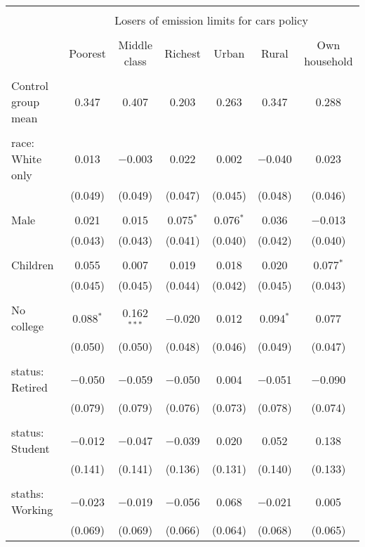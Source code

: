 
\begin{tabular}{@{\extracolsep{5pt}}lcccccc} 
\\[-1.8ex]\hline 
\hline \\[-1.8ex] 
 & \multicolumn{6}{c}{Losers of emission limits for cars policy} \\ 
\cline{2-7} 
\\[-1.8ex] & Poorest & Middle class & Richest & Urban & Rural & Own household \\ 
\hline \\[-1.8ex] 
 Control group mean & 0.347 & 0.407 & 0.203 & 0.263 & 0.347 & 0.288  \\ \hline \\[-1.8ex] race: White only & 0.013 & $-$0.003 & 0.022 & 0.002 & $-$0.040 & 0.023 \\ 
  & (0.049) & (0.049) & (0.047) & (0.045) & (0.048) & (0.046) \\ 
  & & & & & & \\ 
 Male & 0.021 & 0.015 & 0.075$^{*}$ & 0.076$^{*}$ & 0.036 & $-$0.013 \\ 
  & (0.043) & (0.043) & (0.041) & (0.040) & (0.042) & (0.040) \\ 
  & & & & & & \\ 
 Children & 0.055 & 0.007 & 0.019 & 0.018 & 0.020 & 0.077$^{*}$ \\ 
  & (0.045) & (0.045) & (0.044) & (0.042) & (0.045) & (0.043) \\ 
  & & & & & & \\ 
 No college & 0.088$^{*}$ & 0.162$^{***}$ & $-$0.020 & 0.012 & 0.094$^{*}$ & 0.077 \\ 
  & (0.050) & (0.050) & (0.048) & (0.046) & (0.049) & (0.047) \\ 
  & & & & & & \\ 
 status: Retired & $-$0.050 & $-$0.059 & $-$0.050 & 0.004 & $-$0.051 & $-$0.090 \\ 
  & (0.079) & (0.079) & (0.076) & (0.073) & (0.078) & (0.074) \\ 
  & & & & & & \\ 
 status: Student & $-$0.012 & $-$0.047 & $-$0.039 & 0.020 & 0.052 & 0.138 \\ 
  & (0.141) & (0.141) & (0.136) & (0.131) & (0.140) & (0.133) \\ 
  & & & & & & \\ 
 staths: Working & $-$0.023 & $-$0.019 & $-$0.056 & 0.068 & $-$0.021 & 0.005 \\ 
  & (0.069) & (0.069) & (0.066) & (0.064) & (0.068) & (0.065) \\ 

\end{tabular}
